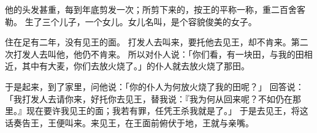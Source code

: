 {他的头发甚重，每到年底剪发一次；所剪下来的，按王的平称一称，重二百舍客勒。
生了三个儿子，一个女儿。女儿名叫{}，是个容貌俊美的女子。
\par }{\PP {}住在{}足有二年，没有见王的面。
打发人去叫{}来，要托他去见王，{}却不肯来。第二次打发人去叫他，他仍不肯来。
所以{}对仆人说：「你们看，{}有一块田，与我的田相近，其中有大麦，你们去放火烧了。」{}的仆人就去放火烧了那田。
\par }{\PP {}于是{}起来，到了{}家里，问他说：「你的仆人为何放火烧了我的田呢？」
回答{}说：「我打发人去请你来，好托你去见王，替我说：『我为何从{}回来呢？不如仍在那里。』现在要许我见王的面；我若有罪，任凭王杀我就是了。」
于是{}去见王，将这话奏告王，王便叫{}来。{}来见王，在王面前俯伏于地，王就与{}亲嘴。

}
